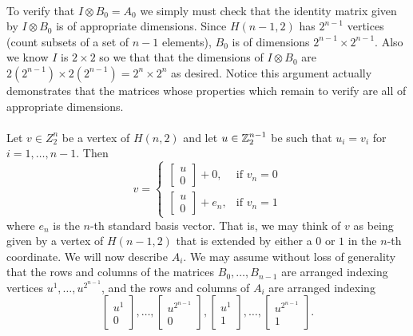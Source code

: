 \documentclass[letterpaper,12pt,oneside,onecolumn]{article}
\newcommand{\1}{\mathbbm{1}}
\begin{document}
\paragraph{}
To verify that $I \otimes B_0 = A_0$ we simply must check that the identity matrix given by $I \otimes B_0$ is of appropriate dimensions. Since $H(n-1,2)$ has $2^{n-1}$ vertices (count subsets of a set of $n-1$ elements), $B_0$ is of dimensions $2^{n-1} \times 2^{n-1}$. Also we know $I$ is $2\times 2$ so we that that the dimensions of $I \otimes B_0$ are
$2(2^{n-1}) \times 2(2^{n-1}) = 2^n \times 2^n$
as desired. Notice this argument actually demonstrates that the matrices whose properties which remain to verify are all of appropriate dimensions.
\paragraph{}
Let $v \in Z^n_2$ be a vertex  of $H(n,2)$ and let $u\in \mathbb{Z}^{n-1}_2$ be such that $u_i = v_i$ for $i = 1, \dots, n-1$. Then 
$$v = \begin{cases}\begin{bmatrix}u\\0\end{bmatrix} + 0, &\text{if $v_n = 0$} \\ \begin{bmatrix}u\\0\end{bmatrix} + e_n, &\text{if $v_n = 1$} \end{cases}$$
where $e_n$ is the $n$-th standard basis vector. That is, we may think of $v$ as being given by a vertex of $H(n-1,2)$ that is extended by either a $0$ or $1$ in the $n$-th coordinate. We will now describe $A_i$. We may assume without loss of generality that the rows and columns of the matrices $B_0, \dots, B_{n-1}$ are arranged indexing vertices $u^1, \dots, u^{2^{n-1}}$, and the rows and columns of $A_i$ are arranged indexing $$\begin{bmatrix}u^1 \\ 0 \end{bmatrix} , \dots, \begin{bmatrix}u^{2^{n-1}} \\ 0 \end{bmatrix}, \begin{bmatrix}u^1 \\ 1 \end{bmatrix}, \dots, \begin{bmatrix}u^{2^{n-1}} \\ 1 \end{bmatrix}.$$
\end{document}
